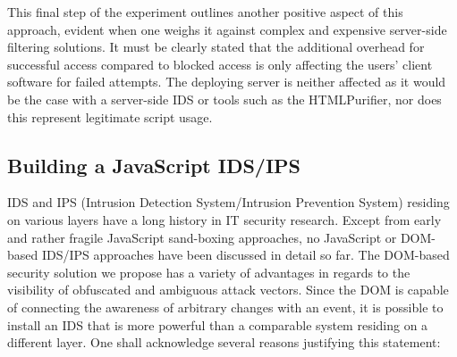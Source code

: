       This final step of the experiment outlines another positive aspect of this approach, evident when one weighs it against complex and expensive server-side filtering solutions. It must be clearly stated that the additional overhead for successful access compared to blocked access is only affecting the users' client software for failed attempts. The deploying server is neither affected as it would be the case with a server-side IDS or tools such as the HTMLPurifier, nor does this represent legitimate script usage.

    \subsection{Building a JavaScript IDS/IPS}
    \label{subsubsec:6.6.5.building_a_javascript_ids_ips}

     IDS and IPS (Intrusion Detection System/Intrusion Prevention System) residing on various layers have a long history in IT security research. Except from early and rather fragile JavaScript sand-boxing approaches, no JavaScript or DOM-based IDS/IPS approaches have been discussed in detail so far. The DOM-based security solution we propose has a variety of advantages in regards to the visibility of obfuscated and ambiguous attack vectors. Since the DOM is capable of connecting the awareness of arbitrary changes with an event, it is possible to install an IDS that is more powerful than a comparable system residing on a different layer. One shall acknowledge several reasons justifying this statement: 

